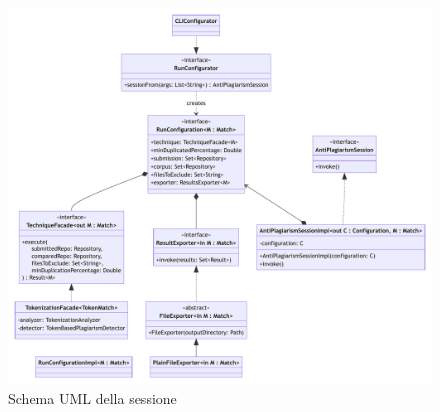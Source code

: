 \begin{figure}
    \centering
    \includegraphics[width=0.9\textheight]{resources/img/02-session.pdf}
    \caption{Schema UML della sessione}
    \label{img:02-session}
\end{figure}
